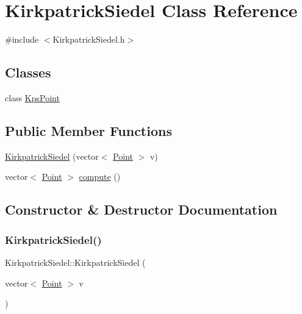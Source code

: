 \hypertarget{class_kirkpatrick_siedel}{}\section{Kirkpatrick\+Siedel Class Reference}
\label{class_kirkpatrick_siedel}


{\ttfamily \#include $<$Kirkpatrick\+Siedel.\+h$>$}

\subsection*{Classes}
\begin{DoxyCompactItemize}
\item 
class \mbox{\hyperlink{class_kirkpatrick_siedel_1_1_kps_point}{Kps\+Point}}
\end{DoxyCompactItemize}
\subsection*{Public Member Functions}
\begin{DoxyCompactItemize}
\item 
\mbox{\hyperlink{class_kirkpatrick_siedel_ac093d089049ebc7708e796f9c05dc0ff}{Kirkpatrick\+Siedel}} (vector$<$ \mbox{\hyperlink{class_point}{Point}} $>$ v)
\item 
vector$<$ \mbox{\hyperlink{class_point}{Point}} $>$ \mbox{\hyperlink{class_kirkpatrick_siedel_ac301f763865d166ed8e049547adeeb44}{compute}} ()
\end{DoxyCompactItemize}


\subsection{Constructor \& Destructor Documentation}
\mbox{\label{class_kirkpatrick_siedel_ac093d089049ebc7708e796f9c05dc0ff}} 
\subsubsection{\texorpdfstring{KirkpatrickSiedel()}{KirkpatrickSiedel()}}
{\footnotesize\ttfamily Kirkpatrick\+Siedel\+::\+Kirkpatrick\+Siedel (\begin{DoxyParamCaption}\item[{vector$<$ \mbox{\hyperlink{class_point}{Point}} $>$}]{v }\end{DoxyParamCaption})}



